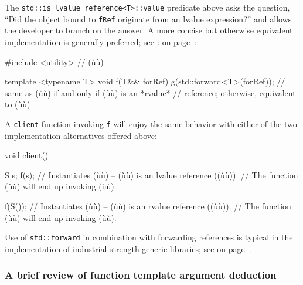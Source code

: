 \noindent The \texttt{std::is\_lvalue\_reference<T>::value} predicate above asks
the question, ``Did the object bound to \texttt{fRef} originate
from an lvalue expression?'' and allows the developer to branch on the
answer. A more concise but otherwise equivalent implementation is
generally preferred; see \textit{: } on page~\pageref{the-std::forward-utility}:

\begin{emcppslisting}
#include <utility>  // (ù{}ù)

template <typename T>
void f(T&& forRef)
{
    g(std::forward<T>(forRef));
        // same as (ù{}ù) if and only if (ù{}ù) is an *rvalue*
        // reference; otherwise, equivalent to (ù{}ù)
}
\end{emcppslisting}

\noindent A \texttt{client} function invoking \texttt{f} will enjoy the same
behavior with either of the two implementation alternatives offered
above:

\begin{emcppslisting}
void client()
{
    S s;
    f(s);    // Instantiates (ù{}ù) -- (ù{}ù) is an lvalue reference ((ù{}ù)).
             // The function (ù{}ù) will end up invoking (ù{}ù).

    f(S());  // Instantiates (ù{}ù) -- (ù{}ù) is an rvalue reference ((ù{}ù)).
             // The function (ù{}ù) will end up invoking (ù{}ù).
}
\end{emcppslisting}

\noindent Use of \texttt{std::forward} in combination with forwarding references
is typical in the implementation of industrial-strength generic
libraries; see \textit{} on page~\pageref{use-cases-forwardingref}.

\subsubsection[A brief review of function template argument deduction]{A brief review of function template argument deduction}\label{a-brief-review-of-function-template-argument-deduction}

